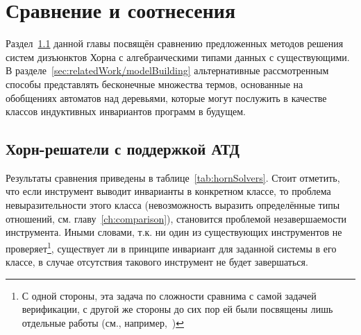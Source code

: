 \chapter{Сравнение и соотнесения}\label{ch:relatedWork}


Раздел~\cref{sec:relatedWork/hornSolvers} данной главы посвящён сравнению предложенных методов решения систем дизъюнктов Хорна с алгебраическими типами данных с существующими.
В разделе~\cref{sec:relatedWork/modelBuilding} альтернативные рассмотренным способы представлять бесконечные множества термов, основанные на обобщениях автоматов над деревьями, которые могут послужить в качестве классов индуктивных инвариантов программ в будущем.

\section{Хорн-решатели с поддержкой АТД}\label{sec:relatedWork/hornSolvers}

Результаты сравнения приведены в таблице~\cref{tab:hornSolvers}.
Стоит отметить, что если инструмент выводит инварианты в конкретном классе, то проблема невыразительности этого класса (невозможность выразить определённые типы отношений, см. главу~\cref{ch:comparison}), становится проблемой незавершаемости инструмента. Иными словами, т.к. ни один из существующих инструментов не проверяет\footnote{С одной стороны, эта задача по сложности сравнима с самой задачей верификации, с другой же стороны до сих пор ей были посвящены лишь отдельные работы (см., например,~\cite{10.1145/3022187,10.1145/2837614.2837640})}, существует ли в принципе инвариант для заданной системы в его классе, в случае отсутствия такового инструмент не будет завершаться.

